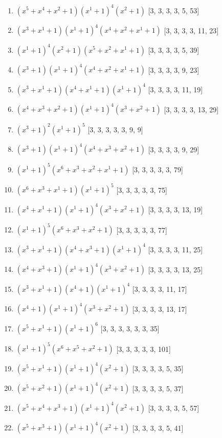 \documentclass[10pt,twocolumn]{article}
\begin{document}
\begin{enumerate}
\item $(x^{5} + x^{4} + x^{2} + 1)(x^{1} + 1)^{4}(x^{2} + 1)$  [3, 3, 3, 3, 5, 53]
\item $(x^{3} + x^{1} + 1)(x^{1} + 1)^{4}(x^{4} + x^{2} + x^{1} + 1)$  [3, 3, 3, 3, 11, 23]
\item $(x^{1} + 1)^{4}(x^{2} + 1)(x^{5} + x^{2} + x^{1} + 1)$  [3, 3, 3, 3, 5, 39]
\item $(x^{3} + 1)(x^{1} + 1)^{4}(x^{4} + x^{2} + x^{1} + 1)$  [3, 3, 3, 3, 9, 23]
\item $(x^{3} + x^{1} + 1)(x^{4} + x^{1} + 1)(x^{1} + 1)^{4}$  [3, 3, 3, 3, 11, 19]
\item $(x^{4} + x^{3} + x^{2} + 1)(x^{1} + 1)^{4}(x^{3} + x^{2} + 1)$  [3, 3, 3, 3, 13, 29]
\item $(x^{3} + 1)^{2}(x^{1} + 1)^{5}$  [3, 3, 3, 3, 3, 9, 9]
\item $(x^{3} + 1)(x^{1} + 1)^{4}(x^{4} + x^{3} + x^{2} + 1)$  [3, 3, 3, 3, 9, 29]
\item $(x^{1} + 1)^{5}(x^{6} + x^{3} + x^{2} + x^{1} + 1)$  [3, 3, 3, 3, 3, 79]
\item $(x^{6} + x^{3} + x^{1} + 1)(x^{1} + 1)^{5}$  [3, 3, 3, 3, 3, 75]
\item $(x^{4} + x^{1} + 1)(x^{1} + 1)^{4}(x^{3} + x^{2} + 1)$  [3, 3, 3, 3, 13, 19]
\item $(x^{1} + 1)^{5}(x^{6} + x^{3} + x^{2} + 1)$  [3, 3, 3, 3, 3, 77]
\item $(x^{3} + x^{1} + 1)(x^{4} + x^{3} + 1)(x^{1} + 1)^{4}$  [3, 3, 3, 3, 11, 25]
\item $(x^{4} + x^{3} + 1)(x^{1} + 1)^{4}(x^{3} + x^{2} + 1)$  [3, 3, 3, 3, 13, 25]
\item $(x^{3} + x^{1} + 1)(x^{4} + 1)(x^{1} + 1)^{4}$  [3, 3, 3, 3, 11, 17]
\item $(x^{4} + 1)(x^{1} + 1)^{4}(x^{3} + x^{2} + 1)$  [3, 3, 3, 3, 13, 17]
\item $(x^{5} + x^{1} + 1)(x^{1} + 1)^{6}$  [3, 3, 3, 3, 3, 3, 35]
\item $(x^{1} + 1)^{5}(x^{6} + x^{5} + x^{2} + 1)$  [3, 3, 3, 3, 3, 101]
\item $(x^{5} + x^{1} + 1)(x^{1} + 1)^{4}(x^{2} + 1)$  [3, 3, 3, 3, 5, 35]
\item $(x^{5} + x^{2} + 1)(x^{1} + 1)^{4}(x^{2} + 1)$  [3, 3, 3, 3, 5, 37]
\item $(x^{5} + x^{4} + x^{3} + 1)(x^{1} + 1)^{4}(x^{2} + 1)$  [3, 3, 3, 3, 5, 57]
\item $(x^{5} + x^{3} + 1)(x^{1} + 1)^{4}(x^{2} + 1)$  [3, 3, 3, 3, 5, 41]

\end{enumerate}
\end{document}
